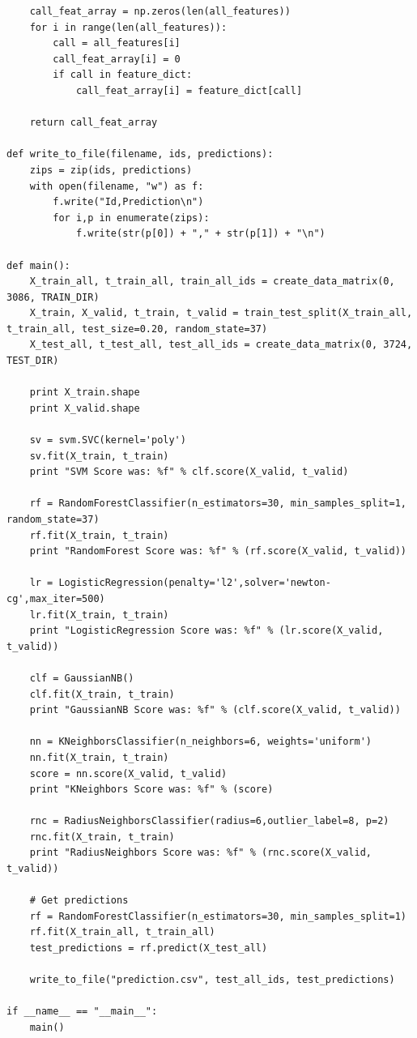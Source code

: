 \documentclass[11pt]{article}
\begin{document}
\begin{lstlisting}
    call_feat_array = np.zeros(len(all_features))
    for i in range(len(all_features)):
        call = all_features[i]
        call_feat_array[i] = 0
        if call in feature_dict:
            call_feat_array[i] = feature_dict[call]

    return call_feat_array

def write_to_file(filename, ids, predictions):
    zips = zip(ids, predictions)
    with open(filename, "w") as f:
        f.write("Id,Prediction\n")
        for i,p in enumerate(zips):
            f.write(str(p[0]) + "," + str(p[1]) + "\n")

def main():
    X_train_all, t_train_all, train_all_ids = create_data_matrix(0, 3086, TRAIN_DIR)
    X_train, X_valid, t_train, t_valid = train_test_split(X_train_all, t_train_all, test_size=0.20, random_state=37)
    X_test_all, t_test_all, test_all_ids = create_data_matrix(0, 3724, TEST_DIR)

    print X_train.shape
    print X_valid.shape
    
    sv = svm.SVC(kernel='poly')
    sv.fit(X_train, t_train)
    print "SVM Score was: %f" % clf.score(X_valid, t_valid)

    rf = RandomForestClassifier(n_estimators=30, min_samples_split=1, random_state=37)
    rf.fit(X_train, t_train)
    print "RandomForest Score was: %f" % (rf.score(X_valid, t_valid))

    lr = LogisticRegression(penalty='l2',solver='newton-cg',max_iter=500)
    lr.fit(X_train, t_train)
    print "LogisticRegression Score was: %f" % (lr.score(X_valid, t_valid))

    clf = GaussianNB()
    clf.fit(X_train, t_train)
    print "GaussianNB Score was: %f" % (clf.score(X_valid, t_valid))

    nn = KNeighborsClassifier(n_neighbors=6, weights='uniform')
    nn.fit(X_train, t_train)
    score = nn.score(X_valid, t_valid)
    print "KNeighbors Score was: %f" % (score)

    rnc = RadiusNeighborsClassifier(radius=6,outlier_label=8, p=2)
    rnc.fit(X_train, t_train)
    print "RadiusNeighbors Score was: %f" % (rnc.score(X_valid, t_valid))

    # Get predictions
    rf = RandomForestClassifier(n_estimators=30, min_samples_split=1)
    rf.fit(X_train_all, t_train_all)
    test_predictions = rf.predict(X_test_all)

    write_to_file("prediction.csv", test_all_ids, test_predictions)

if __name__ == "__main__":
    main()
\end{lstlisting}
\end{document}
